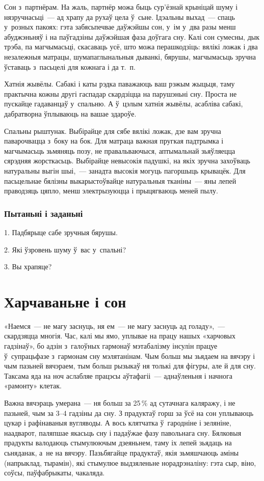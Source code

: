 Сон з~партнёрам. На жаль, партнёр можа быць сур'ёзнай крыніцай шуму і нязручнасьці~--- ад храпу да рухаў цела ў~сьне. Ідэальны выхад~--- спаць у~розных пакоях: гэта забясьпечвае даўжэйшы сон, у~ім у~два разы менш абуджэньняў і на паўгадзіны даўжэйшая фаза доўгага сну. Калі сон сумесны, дык трэба, па магчымасьці, скасаваць усё, што можа перашкодзіць: вялікі ложак і два незалежныя матрацы, шумапаглынальныя дыванкі, бярушы, магчымасьць зручна ўставаць з~пасьцелі для кожнага і да т.~п.

Хатнія жывёлы. Сабакі і каты рэдка паважаюць ваш рэжым жыцьця, таму практычна кожны другі гаспадар скардзіцца на парушэньні сну. Проста не пускайце гадаванцаў у~спальню. А ў~цэлым хатнія жывёлы, асабліва сабакі, дабратворна ўплываюць на вашае здароўе.

Спальны рыштунак. Выбірайце для сябе вялікі ложак, дзе вам зручна паварочвацца з~боку на бок. Для матраца важная пругкая падтрымка і магчымасьць зьмяняць позу, не правальваючыся, аптымальнай зьяўляецца сярэдняя жорсткасьць. Выбірайце невысокія падушкі, на якіх зручна захоўваць натуральны выгін шыі,~--- занадта высокія могуць пагоршыць крывацёк. Для пасьцельнае бялізны выкарыстоўвайце натуральныя тканіны~--- яны лепей праводзяць цяпло, менш электрызуюцца і прыцягваюць меней пылу.

\subsubsection{Пытаньні і заданьні}

1. Падбярыце сабе зручныя бярушы.

2. Які ўзровень шуму ў~вас у~спальні?

3. Вы храпяце?


\section{Харчаваньне і сон}

«Наемся~--- не магу заснуць, ня ем~--- не магу заснуць ад голаду»,~--- скардзяцца многія. Час, калі мы ямо, уплывае на працу нашых «харчовых гадзінаў», бо адзін з~галоўных гармонаў мэтабалізму інсулін працуе ў~супрацьфазе з~гармонам сну мэлятанінам. Чым больш мы зьядаем на вячэру і чым пазьней вячэраем, тым больш рызыкаў ня толькі для фігуры, але й для сну. Таксама яда на ноч аслабляе працэсы аўтафагіі~--- аднаўленьня і начнога «рамонту» клетак.

Важна вячэраць умерана~--- ня больш за 25\,\% ад сутачнага каляражу, і не пазьней, чым за 3--4 гадзіны да сну. З прадуктаў горш за ўсё на сон уплываюць цукар і рафінаваныя вугляводы. А вось клятчатка ў~гародніне і зеляніне, наадварот, паляпшае якасьць сну і падаўжае фазу павольнага сну. Бялковыя прадукты валодаюць стымулюючым дзеяньнем, таму іх лепей зьядаць на сьняданак, а~не на вячэру. Пазьбягайце прадуктаў, якія зьмяшчаюць аміны (напрыклад, тырамін), які стымулюе выдзяленьне норадрэналіну: гэта сыр, віно, соўсы, паўфабрыкаты, чакаляда.

